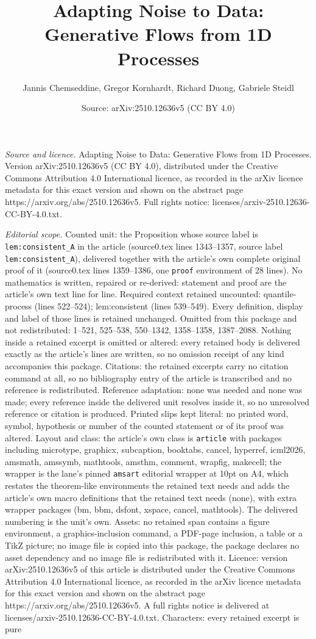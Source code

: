 \documentclass[10pt,a4paper]{amsart}
\title[Adapting Noise to Data: Generative Flows from 1D Processes]{Adapting Noise to Data: Generative Flows from 1D Processes}
\author{Jannis Chemseddine, Gregor Kornhardt, Richard Duong, Gabriele Steidl}
\date{Source: arXiv:2510.12636v5 (CC BY 4.0)}
\begin{document}
\maketitle

\noindent\emph{Source and licence.} Adapting Noise to Data: Generative Flows from 1D Processes. Version arXiv:2510.12636v5 (CC BY 4.0), distributed under the Creative Commons Attribution 4.0 International licence, as recorded in the arXiv licence metadata for this exact version and shown on the abstract page https://arxiv.org/abs/2510.12636v5. Full rights notice: licenses/arxiv-2510.12636-CC-BY-4.0.txt.\par\smallskip

\noindent\textit{Editorial scope.} Counted unit: the Proposition whose source label is \texttt{lem:consistent\_A} in the article (source0.tex lines 1343--1357, source label \texttt{lem:consistent\_A}), delivered together with the article's own complete original proof of it (source0.tex lines 1359--1386, one \texttt{proof} environment of 28 lines). No mathematics is written, repaired or re-derived: statement and proof are the article's own text line for line. Required context retained uncounted: quantile-process (lines 522--524); lem:consistent (lines 539--549). Every definition, display and label of those lines is retained unchanged. Omitted from this package and not redistributed: 1--521, 525--538, 550--1342, 1358--1358, 1387--2088. Nothing inside a retained excerpt is omitted or altered: every retained body is delivered exactly as the article's lines are written, so no omission receipt of any kind accompanies this package. Citations: the retained excerpts carry no citation command at all, so no bibliography entry of the article is transcribed and no reference is redistributed. Reference adaptation: none was needed and none was made; every reference inside the delivered unit resolves inside it, so no unresolved reference or citation is produced. Printed slips kept literal: no printed word, symbol, hypothesis or number of the counted statement or of its proof was altered. Layout and class: the article's own class is \texttt{article} with packages including microtype, graphicx, subcaption, booktabs, cancel, hyperref, icml2026, amsmath, amssymb, mathtools, amsthm, comment, wrapfig, makecell; the wrapper is the lane's pinned \texttt{amsart} editorial wrapper at 10pt on A4, which restates the theorem-like environments the retained text needs and adds the article's own macro definitions that the retained text needs (none), with extra wrapper packages (bm, bbm, dsfont, xspace, cancel, mathtools). The delivered numbering is the unit's own. Assets: no retained span contains a figure environment, a graphics-inclusion command, a PDF-page inclusion, a table or a TikZ picture; no image file is copied into this package, the package declares no asset dependency and no image file is redistributed with it. Licence: version arXiv:2510.12636v5 of this article is distributed under the Creative Commons Attribution 4.0 International licence, as recorded in the arXiv licence metadata for this exact version and shown on the abstract page https://arxiv.org/abs/2510.12636v5. A full rights notice is delivered at licenses/arxiv-2510.12636-CC-BY-4.0.txt. Characters: every retained excerpt is pure 
\end{document}
